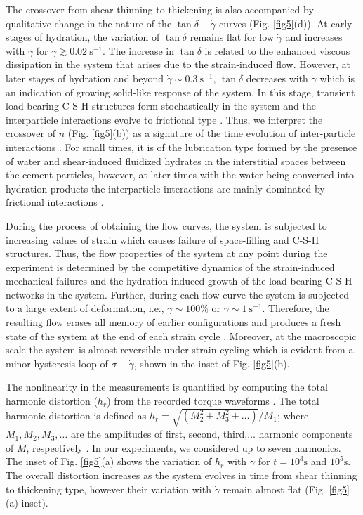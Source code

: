 \documentclass[final,5p,twocolumn]{elsarticle}
\begin{document}
{The  crossover from shear thinning to thickening  is also accompanied by qualitative change in the nature of the $\tan\delta-\dot\gamma$ curves (Fig. \ref{fig5}(d)). At early stages of hydration, the variation of $\tan\delta$ remains flat for low $\dot\gamma$ and increases with $\dot\gamma$ for $\dot\gamma\gtrsim0.02~\mbox{s}^{-1}$. The increase in $\tan\delta$ is related to the enhanced viscous dissipation in the system  that arises due to the strain-induced flow.  However, at later stages of hydration and beyond $\dot\gamma\sim0.3~\mbox{s}^{-1}$,  $\tan\delta$ decreases with $\dot\gamma$ which is an indication of growing solid-like response of the system. In this stage, transient load bearing C-S-H structures form stochastically in the system and the interparticle interactions evolve to frictional type \cite{yammine_2008}. Thus, we interpret the crossover of $n$ (Fig. \ref{fig5}(b)) as a signature of the time evolution of inter-particle interactions \cite{schmidt_rheological_2002, mahaut_effect_2008}. For small times, it is of the lubrication type formed by the presence of water and shear-induced fluidized hydrates in the interstitial spaces between the cement particles, however, at later times with the water being converted into hydration products the interparticle interactions are mainly dominated by  frictional interactions \cite{yammine_2008}. 
	
	
During the process of obtaining the flow curves, the system is subjected to increasing values of strain which causes failure of  space-filling and C-S-H structures. Thus, the flow properties of the system at any  point during the experiment is determined by the  competitive dynamics of the strain-induced  mechanical  failures  and the hydration-induced growth of the load bearing C-S-H networks in the system. Further, during each flow curve the system is subjected to a large extent of deformation, i.e.,  $\gamma \sim 100\%$ or $\dot\gamma\sim1~\mbox{s}^{-1}$. Therefore, the resulting flow erases all memory of earlier configurations and produces a fresh state of the system at the end of each strain cycle \cite{roussel_origins_2012, struik_rejuvenation_1997, fourmentin_rheology_2015}. Moreover, at the macroscopic scale the system is almost reversible under strain cycling which is evident from a minor hysteresis loop of $\sigma-\dot\gamma$, shown in the inset of Fig.  \ref{fig5}(b). 
	
	The nonlinearity in the measurements is quantified by computing the total harmonic distortion ($h_r$)  from the recorded torque  waveforms \cite{hyun_review_2011}.  The total harmonic distortion is defined as $h_r=\sqrt{(M_2^2+M_3^2+\ldots)}/M_1$; where $M_1, M_2, M_3,\ldots$ are the amplitudes of first, second, third,$\ldots$ harmonic components of $M$, respectively \cite{shmilovitz_2005}.  In our experiments, we considered up to seven harmonics. The inset of Fig. \ref{fig5}(a) shows the variation of $h_r$ with $\dot\gamma$ for $t=10^3\mbox{s}$ and $10^5\mbox{s}$.    The overall distortion increases as the system evolves in time from shear thinning  to thickening type, however their variation with $\dot\gamma$ remain almost flat (Fig. \ref{fig5}(a) inset). 
	
}
\end{document}
